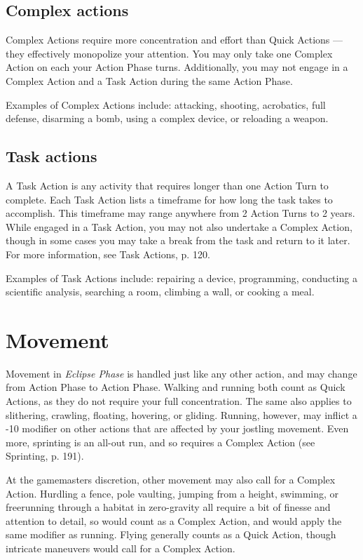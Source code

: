 \subsection{Complex actions}
\label{sec:combat-complex-actions}

Complex Actions require more concentration and effort than Quick Actions --- they effectively monopolize your attention. You may only take one Complex Action on each your Action Phase turns. Additionally, you may not engage in a Complex Action and a Task Action during the same Action Phase.

Examples of Complex Actions include: attacking, shooting, acrobatics, full defense, disarming a bomb, using a complex device, or reloading a weapon.


\subsection{Task actions}
\label{sec:combat-task-actions}

A Task Action is any activity that requires longer than one Action Turn to complete. Each Task Action lists a timeframe for how long the task takes to accomplish. This timeframe may range anywhere from 2 Action Turns to 2 years. While engaged in a Task Action, you may not also undertake a Complex Action, though in some cases you may take a break from the task and return to it later. For more information, see Task Actions, p. 120.

Examples of Task Actions include: repairing a device, programming, conducting a scientific analysis, searching a room, climbing a wall, or cooking a meal.


\section{Movement}
\label{sec:combat-movement}

Movement in \emph{Eclipse Phase} is handled just like any other action, and may change from Action Phase to Action Phase. Walking and running both count as Quick Actions, as they do not require your full concentration. The same also applies to slithering, crawling, floating, hovering, or gliding. Running, however, may inflict a -10 modifier on other actions that are affected by your jostling movement. Even more, sprinting is an all-out run, and so requires a Complex Action (see Sprinting, p. 191).

At the gamemasters discretion, other movement may also call for a Complex Action. Hurdling a fence, pole vaulting, jumping from a height, swimming, or freerunning through a habitat in zero-gravity all require a bit of finesse and attention to detail, so would count as a Complex Action, and would apply the same modifier as running. Flying generally counts as a Quick Action, though intricate maneuvers would call for a Complex Action.


